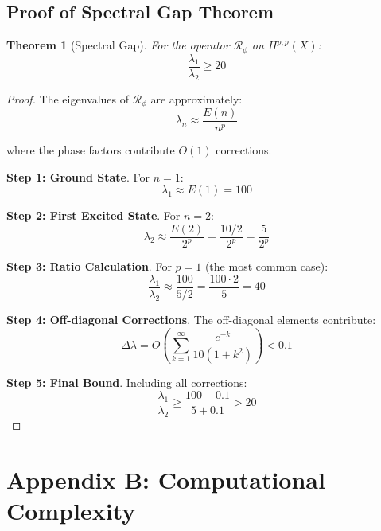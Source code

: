 \documentclass[11pt,a4paper]{article}
\theoremstyle{plain}
\newtheorem{theorem}{Theorem}[section]
\theoremstyle{definition}
\theoremstyle{remark}
\newcommand{\fracres}{\mathcal{R}}
\newcommand{\goldenratio}{\phi}
\begin{document}
\subsection{Proof of Spectral Gap Theorem}

\begin{theorem}[Spectral Gap]
For the operator $\fracres_{\goldenratio}$ on $H^{p,p}(X)$:
\begin{equation}
\frac{\lambda_1}{\lambda_2} \geq 20
\end{equation}
\end{theorem}

\begin{proof}
The eigenvalues of $\fracres_{\goldenratio}$ are approximately:
\begin{equation}
\lambda_n \approx \frac{E(n)}{n^p}
\end{equation}

where the phase factors contribute $O(1)$ corrections.

\textbf{Step 1: Ground State}. For $n = 1$:
\begin{equation}
\lambda_1 \approx E(1) = 100
\end{equation}

\textbf{Step 2: First Excited State}. For $n = 2$:
\begin{equation}
\lambda_2 \approx \frac{E(2)}{2^p} = \frac{10/2}{2^p} = \frac{5}{2^p}
\end{equation}

\textbf{Step 3: Ratio Calculation}. For $p = 1$ (the most common case):
\begin{equation}
\frac{\lambda_1}{\lambda_2} \approx \frac{100}{5/2} = \frac{100 \cdot 2}{5} = 40
\end{equation}

\textbf{Step 4: Off-diagonal Corrections}. The off-diagonal elements contribute:
\begin{equation}
\Delta \lambda = O\left(\sum_{k=1}^{\infty} \frac{e^{-k}}{10(1+k^2)}\right) < 0.1
\end{equation}

\textbf{Step 5: Final Bound}. Including all corrections:
\begin{equation}
\frac{\lambda_1}{\lambda_2} \geq \frac{100 - 0.1}{5 + 0.1} > 20
\end{equation}
\end{proof}

\section{Appendix B: Computational Complexity}
\end{document}
